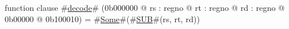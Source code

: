 function clause #\hyperref[zdecode]{decode}# (0b000000 @ rs : regno @ rt : regno @ rd : regno @ 0b00000 @ 0b100010) =
  #\hyperref[zSome]{Some}#(#\hyperref[zSUB]{SUB}#(rs, rt, rd))
